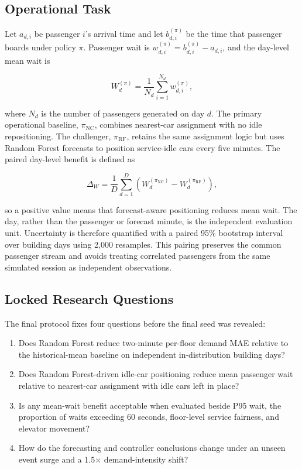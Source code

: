 \documentclass[12pt]{article}
\begin{document}
\subsection{Operational Task}

Let $a_{d,i}$ be passenger $i$'s arrival time and let $b_{d,i}^{(\pi)}$ be the
time that passenger boards under policy $\pi$. Passenger wait is
$w_{d,i}^{(\pi)}=b_{d,i}^{(\pi)}-a_{d,i}$, and the day-level mean wait is

\begin{equation}
  W_d^{(\pi)} = \frac{1}{N_d}\sum_{i=1}^{N_d}w_{d,i}^{(\pi)},
  \label{eq:day-mean-wait}
\end{equation}

where $N_d$ is the number of passengers generated on day $d$. The primary
operational baseline, $\pi_{\mathrm{NC}}$, combines nearest-car assignment with
no idle repositioning. The challenger, $\pi_{\mathrm{RF}}$, retains the same
assignment logic but uses Random Forest forecasts to position service-idle
cars every five minutes. The paired day-level benefit is defined as

\begin{equation}
  \Delta_W = \frac{1}{D}\sum_{d=1}^{D}
  \left(W_d^{(\pi_{\mathrm{NC}})}-W_d^{(\pi_{\mathrm{RF}})}\right),
  \label{eq:paired-wait-effect}
\end{equation}

so a positive value means that forecast-aware positioning reduces mean wait.
The day, rather than the passenger or forecast minute, is the independent
evaluation unit. Uncertainty is therefore quantified with a paired 95\%
bootstrap interval \cite{efron1979bootstrap} over building days using 2,000
resamples. This pairing
preserves the common passenger stream and avoids treating correlated
passengers from the same simulated session as independent observations.

\subsection{Locked Research Questions}

The final protocol fixes four questions before the final seed was revealed:

\begin{enumerate}[label=\textbf{RQ\arabic*:}, leftmargin=3.5em]
  \item Does Random Forest reduce two-minute per-floor demand MAE relative to
  the historical-mean baseline on independent in-distribution building days?
  \item Does Random Forest-driven idle-car positioning reduce mean passenger
  wait relative to nearest-car assignment with idle cars left in place?
  \item Is any mean-wait benefit acceptable when evaluated beside P95 wait,
  the proportion of waits exceeding 60 seconds, floor-level service fairness,
  and elevator movement?
  \item How do the forecasting and controller conclusions change under an
  unseen event surge and a 1.5$\times$ demand-intensity shift?
\end{enumerate}
\end{document}
